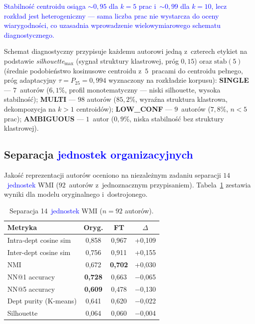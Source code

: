 \documentclass[a4paper,11pt,twocolumn]{article}
\newcommand{\hl}[1]{\textcolor{blue}{#1}}
\begin{document}
\hl{Stabilność centroidu osiąga $\sim\!0{,}95$ dla $k=5$ prac
i~$\sim\!0{,}99$ dla $k=10$, lecz rozkład jest heterogeniczny ---
sama liczba prac nie wystarcza do oceny wiarygodności, co uzasadnia
wprowadzenie wielowymiarowego schematu diagnostycznego.}

Schemat diagnostyczny przypisuje każdemu autorowi jedną z~czterech
etykiet na podstawie \emph{silhouette}$_{\max}$ (sygnał struktury
klastrowej, próg $0{,}15$) oraz $\overline{\text{stab}}(5)$
(średnie podobieństwo kosinusowe centroidu z~$5$~pracami do centroidu
pełnego, próg adaptacyjny $\tau=P_{25}=0{,}994$ wyznaczony na rozkładzie
korpusu): \textbf{SINGLE} ---
$7$~autorów ($6{,}1\%$, profil monotematyczny --- niski silhouette,
wysoka stabilność); \textbf{MULTI} --- $98$ autorów ($85{,}2\%$, wyraźna
struktura klastrowa, dekompozycja na $k\!>\!1$ centroidów);
\textbf{LOW\_CONF} --- $9$~autorów ($7{,}8\%$, $n\!<\!5$ prac);
\textbf{AMBIGUOUS} --- $1$~autor ($0{,}9\%$, niska stabilność bez
struktury klastrowej).


\subsection{Separacja \hl{jednostek organizacyjnych}}

Jakość reprezentacji autorów oceniono na niezależnym zadaniu separacji
$14$~\hl{jednostek} WMI ($92$~autorów z~jednoznacznym przypisaniem).
Tabela~\ref{tab:dept} zestawia wyniki dla modelu oryginalnego
i~dostrojonego.

\begin{table}[t]
\centering
\caption{Separacja 14~\hl{jednostek} WMI ($n=92$ autorów).}
\label{tab:dept}
\small
\begin{tabular}{@{}lccc@{}}
\toprule
Metryka & Oryg. & FT & $\Delta$ \\
\midrule
Intra-dept cosine sim    & 0,858 & 0,967 & +0,109 \\
Inter-dept cosine sim    & 0,756 & 0,911 & +0,155 \\
NMI                      & 0,672 & \textbf{0,702} & +0,030 \\
NN@1 accuracy            & \textbf{0,728} & 0,663 & $-$0,065 \\
NN@5 accuracy            & \textbf{0,609} & 0,478 & $-$0,130 \\
Dept purity (K-means)    & 0,641 & 0,620 & $-$0,022 \\
Silhouette               & 0,064 & 0,060 & $-$0,004 \\
\bottomrule
\end{tabular}
\end{table}
\end{document}
